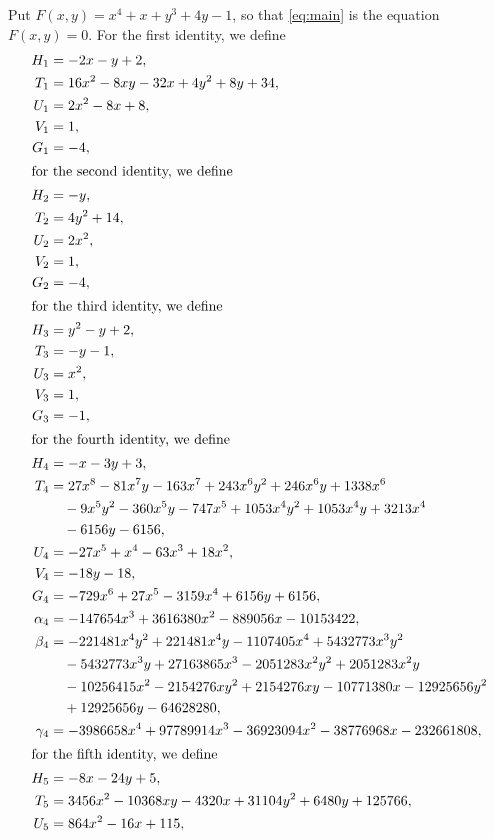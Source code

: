 \documentclass[11pt]{article}
\begin{document}
Put $F(x,y)=x^{4}+x+y^{3}+4y-1$, so that \eqref{eq:main} is the equation $F(x,y)=0$. For the first identity, we define
\begin{align*}
H_{1}&=-2x-y+2,\\
T_{1}&=16x^{2}-8xy-32x+4y^{2}+8y+34,\\
U_{1}&=2x^{2}-8x+8,\\
V_{1}&=1,\\
G_{1}&=-4,\\
\intertext{for the second identity, we define}
H_{2}&=-y,\\
T_{2}&=4y^{2}+14,\\
U_{2}&=2x^{2},\\
V_{2}&=1,\\
G_{2}&=-4,\\
\intertext{for the third identity, we define}
H_{3}&=y^{2}-y+2,\\
T_{3}&=-y-1,\\
U_{3}&=x^{2},\\
V_{3}&=1,\\
G_{3}&=-1,\\
\intertext{for the fourth identity, we define}
H_{4}&=-x-3y+3,\\
T_{4}&=27x^{8}-81x^{7}y-163x^{7}+243x^{6}y^{2}+246x^{6}y+1338x^{6}\\
&\quad-9x^{5}y^{2}-360x^{5}y-747x^{5}+1053x^{4}y^{2}+1053x^{4}y+3213x^{4}\\
&\quad-6156y-6156,\\
U_{4}&=-27x^{5}+x^{4}-63x^{3}+18x^{2},\\
V_{4}&=-18y-18,\\
G_{4}&=-729x^{6}+27x^{5}-3159x^{4}+6156y+6156,\\
\alpha_{4}&=-147654x^{3}+3616380x^{2}-889056x-10153422,\\
\beta_{4}&=-221481x^{4}y^{2}+221481x^{4}y-1107405x^{4}+5432773x^{3}y^{2}\\
&\quad-5432773x^{3}y+27163865x^{3}-2051283x^{2}y^{2}+2051283x^{2}y\\
&\quad-10256415x^{2}-2154276xy^{2}+2154276xy-10771380x-12925656y^{2}\\
&\quad+12925656y-64628280,\\
\gamma_{4}&=-3986658x^{4}+97789914x^{3}-36923094x^{2}-38776968x-232661808,\\
\intertext{for the fifth identity, we define}
H_{5}&=-8x-24y+5,\\
T_{5}&=3456x^{2}-10368xy-4320x+31104y^{2}+6480y+125766,\\
U_{5}&=864x^{2}-16x+115,\\

\end{align*}
\end{document}
